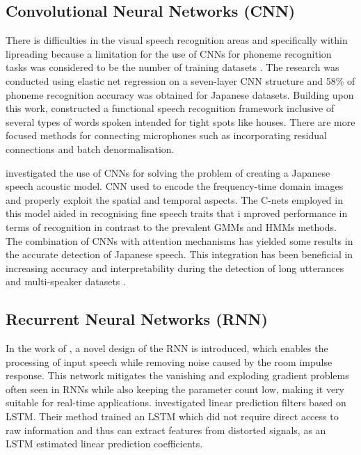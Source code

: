 \subsection{Convolutional Neural Networks (CNN)}
There is difficulties in the visual speech recognition areas and specifically within lipreading because a limitation for the use of CNNs for phoneme recognition tasks was considered to be the number of training datasets \parencite{noda2014lipreading}. The research was conducted using elastic net regression on a seven-layer CNN structure and 58\% of phoneme recognition accuracy was obtained for Japanese datasets. Building upon this work, \textcite{yalta2019cnn} constructed a functional speech recognition framework inclusive of several types of words spoken intended for tight spots like houses. There are more focused methods for connecting microphones such as incorporating residual connections and batch denormalisation. 

\textcite{noda2014lipreading} investigated the use of CNNs for solving the problem of creating a Japanese speech acoustic model. CNN used to encode the frequency-time domain images and properly exploit the spatial and temporal aspects. The C-nets employed in this model aided in recognising fine speech traits that i mproved performance in terms of recognition in contrast to the prevalent GMMs and HMMs methods. The combination of CNNs with attention mechanisms has yielded some results in the accurate detection of Japanese speech. This integration has been beneficial in increasing accuracy and interpretability during the detection of long utterances and multi-speaker datasets \parencite{Mukohara2015Emotion}.


\subsection{Recurrent Neural Networks (RNN)}
In the work of \textcite{takeuchi2020real}, a novel design of the RNN is introduced, which enables the processing of input speech while removing noise caused by the room impulse response. This network mitigates the vanishing and exploding gradient problems often seen in RNNs while also keeping the parameter count low, making it very suitable for real-time applications. \textcite{Kida2016LSTM} investigated linear prediction filters based on LSTM. Their method trained an LSTM which did not require direct access to raw information and thus can extract features from distorted signals, as an LSTM estimated linear prediction coefficients. 

